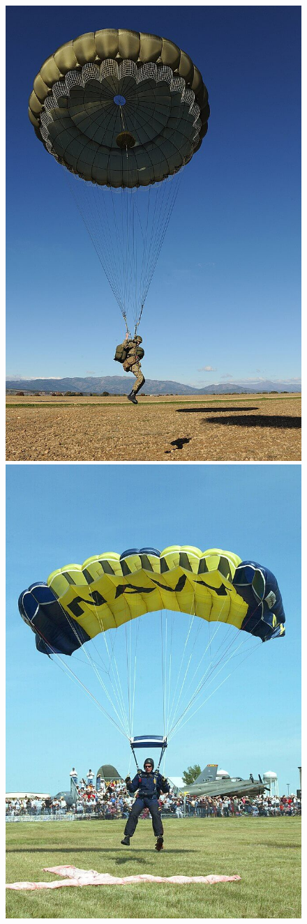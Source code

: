 	\begin{minipage}[c]{1.0\linewidth}
	\begin{figure}[H]
	\begin{minipage}[c]{0.5\linewidth}
	\centering
	\includegraphics[width=0.7\linewidth]{01-EtudeAeronefs/img/paraMili.jpg}
	\end{minipage}
	\begin{minipage}[c]{0.5\linewidth}
	\centering
	\includegraphics[width=0.7\linewidth]{01-EtudeAeronefs/img/paraSport.jpg}

\end{minipage}
\end{figure}
\end{minipage}
